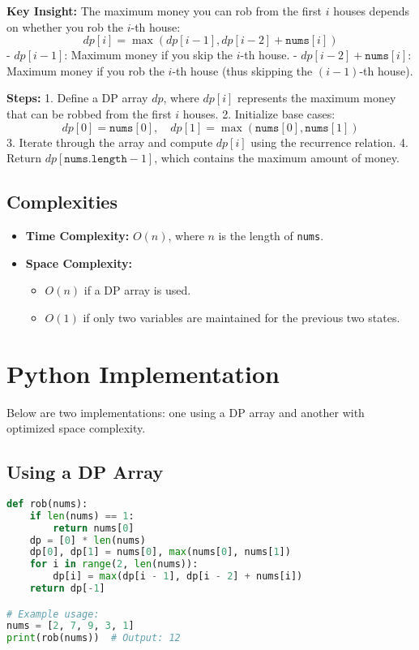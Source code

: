 \textbf{Key Insight:}
The maximum money you can rob from the first \( i \) houses depends on whether you rob the \( i \)-th house:
\[
dp[i] = \max(dp[i-1], dp[i-2] + \texttt{nums}[i])
\]
- \( dp[i-1] \): Maximum money if you skip the \( i \)-th house.
- \( dp[i-2] + \texttt{nums}[i] \): Maximum money if you rob the \( i \)-th house (thus skipping the \((i-1)\)-th house).

\textbf{Steps:}
1. Define a DP array \( dp \), where \( dp[i] \) represents the maximum money that can be robbed from the first \( i \) houses.
2. Initialize base cases:
    \[
    dp[0] = \texttt{nums}[0], \quad dp[1] = \max(\texttt{nums}[0], \texttt{nums}[1])
    \]
3. Iterate through the array and compute \( dp[i] \) using the recurrence relation.
4. Return \( dp[\texttt{nums.length} - 1] \), which contains the maximum amount of money.

\subsection*{Complexities}
\begin{itemize}
    \item \textbf{Time Complexity:} \( O(n) \), where \( n \) is the length of \texttt{nums}.
    \item \textbf{Space Complexity:} 
        \begin{itemize}
            \item \( O(n) \) if a DP array is used.
            \item \( O(1) \) if only two variables are maintained for the previous two states.
        \end{itemize}
\end{itemize}

\section*{Python Implementation}
Below are two implementations: one using a DP array and another with optimized space complexity.

\subsection*{Using a DP Array}
\begin{fullwidth}
\begin{lstlisting}[language=Python]
def rob(nums):
    if len(nums) == 1:
        return nums[0]
    dp = [0] * len(nums)
    dp[0], dp[1] = nums[0], max(nums[0], nums[1])
    for i in range(2, len(nums)):
        dp[i] = max(dp[i - 1], dp[i - 2] + nums[i])
    return dp[-1]

# Example usage:
nums = [2, 7, 9, 3, 1]
print(rob(nums))  # Output: 12
\end{lstlisting}
\end{fullwidth}

